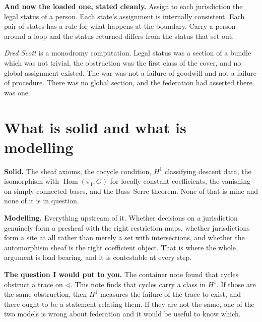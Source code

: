 \documentclass[11pt,a4paper]{article}
\begin{document}
\begin{alarmbox}
\textbf{And now the loaded one, stated cleanly.} Assign to each jurisdiction the
legal status of a person. Each state's assignment is internally consistent. Each
pair of states has a rule for what happens at the boundary. Carry a person around a
loop and the status returned differs from the status that set out.

\emph{Dred Scott} is a monodromy computation. Legal status was a section of a
bundle which was not trivial, the obstruction was the first class of the cover, and
no global assignment existed. The war was not a failure of goodwill and not a
failure of procedure. There was no global section, and the federation had asserted
there was one.
\end{alarmbox}

\section{What is solid and what is modelling}

\begin{alarmbox}
\textbf{Solid.} The sheaf axioms, the cocycle condition, $H^1$ classifying
descent data, the isomorphism with $\operatorname{Hom}(\pi_1, G)$ for locally
constant coefficients, the vanishing on simply connected bases, and the
Bass--Serre theorem. None of that is mine and none of it is in question.

\textbf{Modelling.} Everything upstream of it. Whether decisions on a jurisdiction
genuinely form a presheaf with the right restriction maps, whether jurisdictions
form a site at all rather than merely a set with intersections, and whether the
automorphism sheaf is the right coefficient object. That is where the whole
argument is load bearing, and it is contestable at every step.

\textbf{The question I would put to you.} The container note found that cycles
obstruct a trace on $\triangleleft$. This note finds that cycles carry a class in
$H^1$. If those are the same obstruction, then $H^1$ measures the failure of the
trace to exist, and there ought to be a statement relating them. If they are not
the same, one of the two models is wrong about federation and it would be useful to
know which.
\end{alarmbox}
\end{document}
